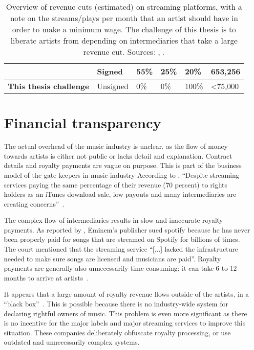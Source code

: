 \begin{table}[]
\begin{tabular}{|l|l|l|l|l|l|}
                               & Signed                      & 55\%               & 25\%                  & 20\%                     & 653,256                                                                                                    \\ \hline
\textbf{This thesis challenge} & Unsigned                    & 0\%                & 0\%                   & 100\%                    & \textless 75,000                                                                                           \\ \hline
\end{tabular}
\caption{Overview of revenue cuts (estimated) on streaming platforms, with a note on the streams/plays per month that an artist should have in order to make a minimum wage. The challenge of this thesis is to liberate artists from depending on intermediaries that take a large revenue cut. Sources: \cite{thetrichordist2014}, \cite{digitalmusicnews2018}.}
\label{tab:revenue-cuts}
\end{table}

\section{Financial transparency}
\label{sec:problem-financial-transparency}
The actual overhead of the music industry is unclear, as the flow of money towards artists is either not public or lacks detail and explanation. Contract details and royalty payments are vague on purpose. This is part of the business model of the gate keepers in music industry %
According to \cite{music2015fair}, ``Despite streaming services paying the same percentage of their revenue (70 percent) to rights holders as an iTunes download sale, low payouts and many intermediaries are creating concerns''~\citep{music2015fair}.

The complex flow of intermediaries results in slow and inaccurate royalty payments. As reported by \cite{bbc2019}, Eminem's publisher sued spotify because he has never been properly paid for songs that are streamed on Spotify for billions of times. The court mentioned that the streaming service ``[...] lacked the infrastructure needed to make sure songs are licensed and musicians are paid''. Royalty payments are generally also unnecessarily time-consuming: it can take 6 to 12 months to arrive at artists~\citep{music2015fair}. 

It appears that a large amount of royalty revenue flows outside of the artists, in a ``black box''~\citep{music2015fair}. %
This is possible because there is no industry-wide system for declaring rightful owners of music. This problem is even more significant as there is no incentive for the major labels and major streaming services to improve this situation. These companies deliberately obfuscate royalty processing, or use outdated and unnecessarily complex systems.

